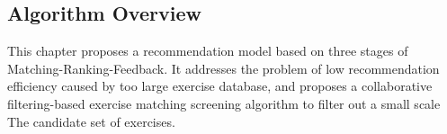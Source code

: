 \subsection{Algorithm Overview}
This chapter proposes a recommendation model based on three stages of Matching-Ranking-Feedback. It addresses the problem of low recommendation efficiency caused by too large exercise database, and proposes a collaborative filtering-based exercise matching screening algorithm to filter out a small scale The candidate set of exercises.


